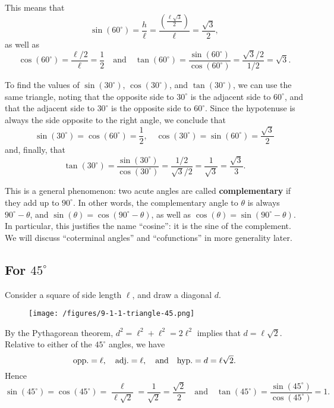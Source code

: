 \documentclass{ximera}
\begin{document}
This means that $$\sin(60^\circ) = \frac{h}{\ell} = \frac{\left(\frac{\ell\sqrt{3}}{2}\right)}{\ell} = \frac{\sqrt{3}}{2},$$as well as $$\cos(60^\circ) = \frac{\ell/2}{\ell} = \frac{1}{2}\quad\mbox{and}\quad \tan(60^\circ) = \frac{\sin(60^\circ)}{\cos(60^\circ)} = \frac{\sqrt{3}/2}{1/2} = \sqrt{3}.$$

To find the values of $\sin(30^\circ)$, $\cos(30^\circ)$, and $\tan(30^\circ)$, we can use the same triangle, noting that the opposite side to $30^\circ$ is the adjacent side to $60^\circ$, and that the adjacent side to $30^\circ$ is the opposite side to $60^\circ$. Since the hypotenuse is always the side opposite to the right angle, we conclude that $$\sin(30^\circ) = \cos(60^\circ) = \frac{1}{2}, \quad \cos(30^\circ) = \sin(60^\circ) = \frac{\sqrt{3}}{2}$$and, finally, that $$\tan(30^\circ) = \frac{\sin(30^\circ)}{\cos(30^\circ)} = \frac{1/2}{\sqrt{3}/2} = \frac{1}{\sqrt{3}} = \frac{\sqrt{3}}{3}.$$

\begin{remark}
  This is a general phenomenon: two acute angles are called {\bf complementary} if they add up to $90^\circ$. In other words, the complementary angle to $\theta$ is always $90^\circ - \theta$, and $\sin(\theta) = \cos(90^\circ - \theta)$, as well as $\cos(\theta) = \sin(90^\circ - \theta)$. In particular, this justifies the name ``cosine'': it is the sine of the complement. We will discuss ``coterminal angles'' and ``cofunctions'' in more generality later.
\end{remark}

\subsection{For $45^\circ$}

Consider a square of side length $\ell$, and draw a diagonal $d$.

\begin{figure}[h]
  \centering
  \texttt{[image: /figures/9-1-1-triangle-45.png]}
\end{figure}

By the Pythagorean theorem, $d^2 = \ell^2+\ell^2 = 2\ell^2$ implies that $d=\ell\sqrt{2}$. Relative to either of the $45^\circ$ angles, we have $${\rm opp.} = \ell, \quad {\rm adj.} =\ell, \quad\mbox{and}\quad {\rm hyp.}=d=\ell\sqrt{2}.$$
Hence $$\sin(45^\circ) =\cos(45^\circ) =  \frac{\ell}{\ell\sqrt{2}} = \frac{1}{\sqrt{2}} = \frac{\sqrt{2}}{2} \quad\mbox{and}\quad \tan(45^\circ) = \frac{\sin(45^\circ)}{\cos(45^\circ)} = 1.$$
\end{document}
